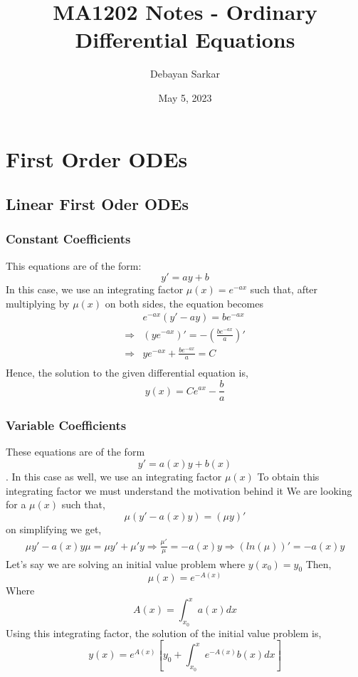 \documentclass[10pt]{article}
\title{MA1202 Notes - Ordinary Differential Equations}
\author{Debayan Sarkar}
\date{May 5, 2023}
\begin{document}
    \maketitle
    \tableofcontents
    \clearpage
    \section{First Order ODEs}
        \subsection{Linear First Oder ODEs}
            \subsubsection{Constant Coefficients}
                This equations are of the form: $$y' = ay + b$$ In this case, we use an integrating factor $\mu(x) = e^{-ax}$  such that, after multiplying by $\mu(x)$ on both sides, the equation becomes
                \begin{align*}
                    &e^{-ax}(y' - ay) = be^{-ax}\\
                    \Rightarrow &(ye^{-ax})' = -(\frac{be^{-ax}}{a})'\\
                    \Rightarrow &ye^{-ax} + \frac{be^{-ax}}{a} = C\\
                \end{align*}
                Hence, the solution to the given differential equation is, $$y(x) = Ce^{ax} - \frac{b}{a}$$
        \subsubsection{ Variable Coefficients}
            These equations are of the form $$y' = a(x)y + b(x)$$.
            In this case as well, we use an integrating factor $\mu(x)$
            To obtain this integrating factor we must understand the motivation behind it
            We are looking for a $\mu(x)$ such that, 
            $$\mu(y' - a(x)y) = (\mu y)'$$
            on simplifying we get, 
            \begin{align*}
                \mu y' - a(x)y\mu = \mu y' + \mu' y
                \Rightarrow \frac{\mu'}{\mu} = -a(x)y
                \Rightarrow (ln(\mu))' = -a(x)y
            \end{align*}
            Let's say we are solving an initial value problem where $y(x_0) = y_0$
            Then, 
            $$\mu(x) = e^{-A(x)}$$
            Where 
            $$A(x) = \int_{x_0}^{x}a(x)dx$$
            Using this integrating factor, the solution of the initial value problem is,
            $$y(x) = e^{A(x)}[y_0 + \int_{x_0}^{x}e^{-A(x)}b(x)dx ]$$
\end{document}
